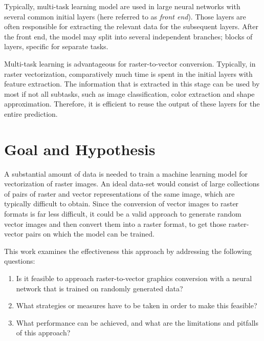 \documentclass[12pt, a4paper, titlepage]{report}
\begin{document}
Typically, multi-task learning model are used in large neural networks with several common initial layers (here referred to as \emph{front end}). Those layers are often responsible for extracting the relevant data for the subsequent layers. After the front end, the model may split into several independent branches; blocks of layers, specific for separate tasks.

\vspace{0.2cm}
Multi-task learning is advantageous for raster-to-vector conversion. Typically, in raster vectorization, comparatively much time is spent in the initial layers with feature extraction. The information that is extracted in this stage can be used by most if not all subtasks, such as image classification, color extraction and shape approximation. Therefore, it is efficient to reuse the output of these layers for the entire prediction.




\chapter{Goal and Hypothesis}

A substantial amount of data is needed to train a machine learning model for vectorization of raster images. An ideal data-set would consist of large collections of pairs of raster and vector representations of the same image, which are typically difficult to obtain. Since the conversion of vector images to raster formats is far less difficult, it could be a valid approach to generate random vector images and then convert them into a raster format, to get those raster-vector pairs on which the model can be trained.


This work examines the effectiveness this approach by addressing the following questions:

\begin{enumerate}[label=\Roman*.]
   \item Is it feasible to approach raster-to-vector graphics conversion with a neural network that is trained on randomly generated data?
   \item What strategies or measures have to be taken in order to make this feasible?
   \item What performance can be achieved, and what are the limitations and pitfalls of this approach?
\end{enumerate}
\end{document}
